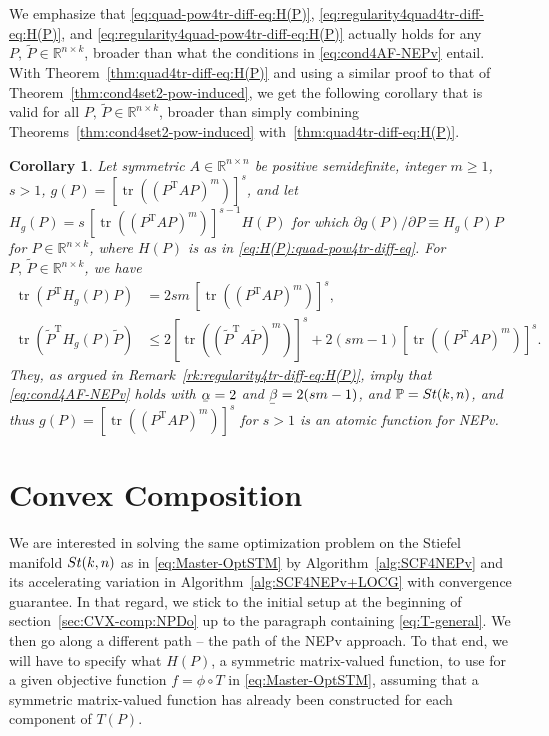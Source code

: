 \documentclass[11pt]{article}
\def\bbP{\mathbb{P}}
\def\bbR{\mathbb{R}}
\def\wtd{\widetilde}
\newcommand\munderbar[1]{%
  \underaccent{\bar}{#1}}
\newcommand\STM[2]{{\rm St}(#1,#2)}
\DeclareMathOperator{\tr}{tr}
\DeclareMathOperator{\T}{T}
\newtheorem{corollary}{Corollary}[section]
\theoremstyle{definition}
\numberwithin{equation}{section}
\begin{document}
We emphasize that  \eqref{eq:quad-pow4tr-diff-eq:H(P)}, \eqref{eq:regularity4quad4tr-diff-eq:H(P)},
and \eqref{eq:regularity4quad-pow4tr-diff-eq:H(P)} actually holds for any $P,\,\wtd P\in\bbR^{n\times k}$,
broader than
what the conditions in \eqref{eq:cond4AF-NEPv} entail.
With Theorem~\ref{thm:quad4tr-diff-eq:H(P)} and using a similar proof to that of
Theorem~\ref{thm:cond4set2-pow-induced}, we get the following corollary that is valid for
all $P,\,\wtd P\in\bbR^{n\times k}$,  broader than
simply combining Theorems~\ref{thm:cond4set2-pow-induced} with~\ref{thm:quad4tr-diff-eq:H(P)}.

\begin{corollary}\label{cor:pow(quad)4tr-diff-eq:H(P)}
Let symmetric $A\in\bbR^{n\times n}$ be positive semidefinite, integer $m\ge 1$, $s>1$, $g(P)=[\tr((P^{\T}AP)^m)]^s$,
and let $H_g(P)=s\,[\tr((P^{\T}AP)^m)]^{s-1}H(P)$
for which $\partial g(P)/\partial P\equiv H_g(P)P$ for $P\in\bbR^{n\times k}$,
where $H(P)$ is as in \eqref{eq:H(P):quad-pow4tr-diff-eq}.
For $P,\,\wtd P\in\bbR^{n\times k}$,
we have
\begin{subequations}\label{eq:pow(quad)4tr-diff-eq:H(P)}
\begin{align}
\tr(P^{\T}H_g(P)P)
    &=2sm\, [\tr((P^{\T}AP)^m)]^s, \label{eq:quad-pow4trpow-diff-eq:H(P)} \\
\tr(\wtd P^{\T}H_g(P)\wtd P)
             &\le 2[\tr((\wtd P^{\T}A\wtd P)^m)]^s+2(sm-1)[\tr((P^{\T}AP)^m)]^s.
                      \label{eq:quad-pow-regularity4pow-diff-eq:H(P)}
\end{align}
\end{subequations}
They, as argued in Remark~\ref{rk:regularity4tr-diff-eq:H(P)}, imply that \eqref{eq:cond4AF-NEPv} holds with $\munderbar\alpha=2$ and $\munderbar\beta=2(sm-1)$, and $\bbP=\STM{k}{n}$,
and thus $g(P)=[\tr((P^{\T}AP)^m)]^s$  for $s>1$ is an atomic function for NEPv.
\end{corollary}

\section{Convex Composition}\label{sec:CVX-comp:NEPv}
We are interested in solving the same optimization problem on the Stiefel manifold $\STM{k}{n}$ as in \eqref{eq:Master-OptSTM}
by Algorithm~\ref{alg:SCF4NEPv} and its accelerating variation in Algorithm~\ref{alg:SCF4NEPv+LOCG}
with convergence guarantee.
In that regard, we stick to the initial setup at the beginning of section~\ref{sec:CVX-comp:NPDo} up to the paragraph containing
\eqref{eq:T-general}. We then go along a different path -- the path of the NEPv approach. To that end, we will
have to specify what $H(P)$, a symmetric matrix-valued function, to use for a given objective
function $f=\phi\circ T$ in \eqref{eq:Master-OptSTM},
assuming that a symmetric matrix-valued function
has already been constructed for each component of $T(P)$.
\end{document}
